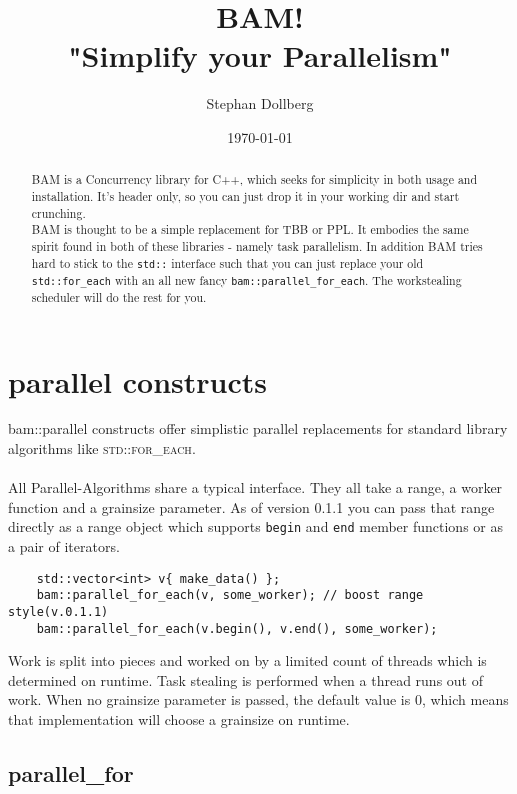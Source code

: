 \documentclass[11pt, a4paper]{article}
\begin{document}
\title{\bf\color{DarkOrchid}BAM!\\
\bf"Simplify your Parallelism"
 }
\author{Stephan Dollberg}
\date{\today}
\maketitle

\begin{abstract}
BAM is a Concurrency library for C++, which seeks for simplicity in both usage and installation. It's header only, so you can just drop it in your working dir and start crunching.\\
BAM is thought to be a simple replacement for TBB or PPL. It embodies the same spirit found in both of these libraries - namely task parallelism. In addition BAM tries hard to stick to the \texttt{std::} interface such that you can just replace your old \texttt{std::for\_each} with an all new fancy \texttt{bam::parallel\_for\_each}. The workstealing scheduler will do the rest for you. 
\end{abstract}

\tableofcontents

\section{parallel constructs}
bam::parallel constructs offer simplistic parallel replacements for standard library algorithms like \textsc{std::for\_each}.
\\\\All Parallel-Algorithms share a typical interface. They all take a range, a worker function and a grainsize parameter. As of version 0.1.1 you can pass that range directly as a range object which supports \texttt{begin} and \texttt{end} member functions or as a pair of iterators.

\begin{lstlisting}
    std::vector<int> v{ make_data() };
    bam::parallel_for_each(v, some_worker); // boost range style(v.0.1.1)
    bam::parallel_for_each(v.begin(), v.end(), some_worker);
\end{lstlisting}

Work is split into pieces and worked on by a limited count of threads which is determined on runtime. Task stealing is performed when a thread runs out of work. When no grainsize parameter is passed, the default value is 0, which means that implementation will choose a grainsize on runtime.

\subsection{parallel\_for}
\end{document}
